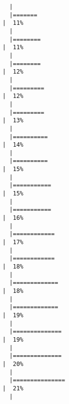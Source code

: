 \documentclass[
  letterpaper,
]{book}
\begin{document}
\begin{verbatim}
  |                                                                            
  |=======                                                               |  11%
  |                                                                            
  |========                                                              |  11%
  |                                                                            
  |========                                                              |  12%
  |                                                                            
  |=========                                                             |  12%
  |                                                                            
  |=========                                                             |  13%
  |                                                                            
  |==========                                                            |  14%
  |                                                                            
  |==========                                                            |  15%
  |                                                                            
  |===========                                                           |  15%
  |                                                                            
  |===========                                                           |  16%
  |                                                                            
  |============                                                          |  17%
  |                                                                            
  |============                                                          |  18%
  |                                                                            
  |=============                                                         |  18%
  |                                                                            
  |=============                                                         |  19%
  |                                                                            
  |==============                                                        |  19%
  |                                                                            
  |==============                                                        |  20%
  |                                                                            
  |===============                                                       |  21%
  |                                                                            

\end{verbatim}
\end{document}
